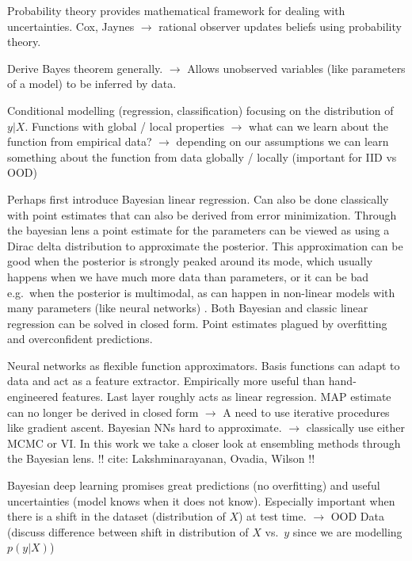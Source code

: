 \documentclass[../thesis.tex]{subfiles}
\begin{document}
Probability theory provides mathematical framework for dealing with uncertainties. Cox, Jaynes $\rightarrow$ rational observer updates beliefs using probability theory.
\bigskip

Derive Bayes theorem generally. $\rightarrow$ Allows unobserved variables (like parameters of a model) to be inferred by data.
\bigskip

Conditional modelling (regression, classification) focusing on the distribution of $y|X$. Functions with global / local properties $\rightarrow$ what can we learn about the function from empirical data? $\rightarrow$ depending on our assumptions we can learn something about the function from data globally / locally (important for IID vs OOD)
\bigskip

Perhaps first introduce Bayesian linear regression. Can also be done classically with point estimates that can also be derived from error minimization. Through the bayesian lens a point estimate for the parameters can be viewed as using a Dirac delta distribution to approximate the posterior. This approximation can be good when the posterior is strongly peaked around its mode, which usually happens when we have much more data than parameters, or it can be bad e.g.\ when the posterior is multimodal, as can happen in non-linear models with many parameters (like neural networks) . Both Bayesian and classic linear regression can be solved in closed form. Point estimates plagued by overfitting and overconfident predictions.
\bigskip

Neural networks as flexible function approximators. Basis functions can adapt to data and act as a feature extractor. Empirically more useful than hand-engineered features. Last layer roughly acts as linear regression. MAP estimate can no longer be derived in closed form $\rightarrow$ A need to use iterative procedures like gradient ascent. Bayesian NNs hard to approximate. $\rightarrow$ classically use either MCMC or VI. In this work we take a closer look at ensembling methods through the Bayesian lens. !! cite: Lakshminarayanan, Ovadia, Wilson !!
\bigskip

Bayesian deep learning promises great predictions (no overfitting) and useful uncertainties (model knows when it does not know). Especially important when there is a shift in the dataset (distribution of $X$) at test time. $\rightarrow$ OOD Data (discuss difference between shift in distribution of $X$ vs.\ $y$ since we are modelling $p(y|X)$)
\end{document}
